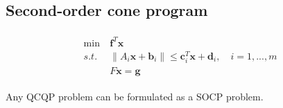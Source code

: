 \par
\subsection{Second-order cone program}
\begin{align}
    \begin{array}{lll}
        \min \ & \mathbf{f}^T \mathbf{x} \\
        s.t. \ & \parallel A_i \mathbf{x} + \mathbf{b}_i \parallel
        \leq \mathbf{c}_i^T\mathbf{x} + \mathbf{d}_i, \quad i = 1,...,m \\
        & F\mathbf{x} = \mathbf{g}
    \end{array}
\end{align}

\begin{lemma}
    Any QCQP problem can be formulated as a SOCP problem.
\end{lemma}

